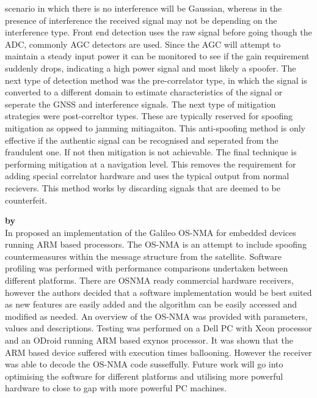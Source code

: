 scenario in which there is no interference will be Gaussian, whereas in the presence of interference the received signal may not be depending on the interference type.
Front end detection uses the raw signal before going though the ADC, commonly AGC detectors are used. Since the AGC will attempt to maintain a steady input power it can
be monitored to see if the gain requirement suddenly drops, indicating a high power signal and most likely a spoofer. The next type of detection method was the
pre-correlator type, in which the signal is converted to a different domain to estimate characteristics of the signal or seperate the GNSS and interference signals. The
next type of mitigation strategies were post-correltor types. These are typically reserved for spoofing mitigation as oppsed to jamming mitiagaiton. This anti-spoofing
method is only effective if the authentic signal can be recognised and seperated from the fraudulent one. If not then mitigation is not achievable. The final technique is
performing mitigation at a navigation level. This removes the requirement for adding special correlator hardware and uses the typical output from normal recievers. This
method works by discarding signals that are deemed to be counterfeit.

\medskip

\textbf{\emph{} by \citeauthor{RN36}} \\
In \citeyear{RN36} \citeauthor{RN36} \cite{RN36} proposed an implementation of the Galileo OS-NMA for embedded devices running ARM based processors. The OS-NMA is an
attempt to include spoofing countermeasures within the message structure from the satellite. Software profiling was performed with performance comparisons undertaken
between different platforms. There are OSNMA ready commercial hardware receivers, however the authors decided that a software implementation would be best suited as new
features are easily added and the algorithm can be easily accessed and modified as needed. An overview of the OS-NMA was provided with parameters, values and
descriptions. Testing was performed on a Dell PC with Xeon processor and an ODroid running ARM based exynos processor. It was shown that the ARM based device suffered
with execution times ballooning. However the receiver was able to decode the OS-NMA code susseffully. Future work will go into optimising the software for different
platforms and utilising more powerful hardware to close to gap with more powerful PC machines.

\medskip

